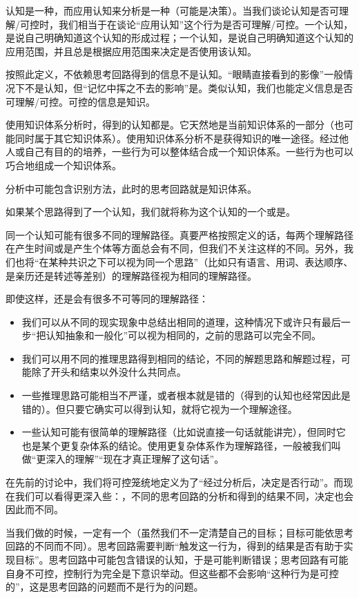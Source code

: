 \begin{explain}
认知是一种，而应用认知来分析是一种（可能是决策）。当我们谈论认知是否可理解/可控时，我们相当于在谈论“应用认知”这个行为是否可理解/可控。一个认知，是说自己明确知道这个认知的形成过程；一个认知，是说自己明确知道这个认知的应用范围，并且总是根据应用范围来决定是否使用该认知。

按照此定义，不依赖思考回路得到的信息不是认知。“眼睛直接看到的影像”一般情况下不是认知，但“记忆中挥之不去的影响”是。类似认知，我们也能定义信息是否可理解/可控。可控的信息是知识。

使用知识体系分析时，得到的认知都是。它天然地是当前知识体系的一部分（也可能同时属于其它知识体系）。使用知识体系分析不是获得知识的唯一途径。经过他人或自己有目的的培养，一些行为可以整体结合成一个知识体系。一些行为也可以巧合地组成一个知识体系。

分析中可能包含识别方法，此时的思考回路就是知识体系。
\end{explain}
如果某个思路得到了一个认知，我们就将称为这个认知的一个或是。%
\begin{explain}
同一个认知可能有很多不同的理解路径。真要严格按照定义的话，每两个理解路径在产生时间或是产生个体等方面总会有不同，但我们不关注这样的不同。另外，我们也将“在某种共识之下可以视为同一个思路”（比如只有语言、用词、表达顺序、是亲历还是转述等差别）的理解路径视为相同的理解路径。

即使这样，还是会有很多不可等同的理解路径：
\begin{itemize}
\item 我们可以从不同的现实现象中总结出相同的道理，这种情况下或许只有最后一步“把认知抽象和一般化”可以视为相同的，之前的思路可以完全不同。
\item 我们可以用不同的推理思路得到相同的结论，不同的解题思路和解题过程，可能除了开头和结束以外没什么共同点。
\item 一些推理思路可能相当不严谨，或者根本就是错的（得到的认知也经常因此是错的）。但只要它确实可以得到认知，就将它视为一个理解途径。
\item 一些认知可能有很简单的理解路径（比如说直接一句话就能讲完），但同时它也是某个更复杂体系的结论。使用更复杂体系作为理解路径，一般被我们叫做“更深入的理解”“现在才真正理解了这句话”。
\end{itemize}
\end{explain}
在先前的讨论中，我们将可控笼统地定义为了“经过分析后，决定是否行动”。而现在我们可以看得更深入些：，不同的思考回路的分析和得到的结果不同，决定也会因此而不同。
\begin{explain}
当我们做的时候，一定有一个（虽然我们不一定清楚自己的目标；目标可能依思考回路的不同而不同）。思考回路需要判断“触发这一行为，得到的结果是否有助于实现目标”。思考回路中可能包含错误的认知，于是可能判断错误；思考回路有可能自身不可控，控制行为完全是下意识举动。但这些都不会影响“这种行为是可控的”，这是思考回路的问题而不是行为的问题。
\end{explain}

